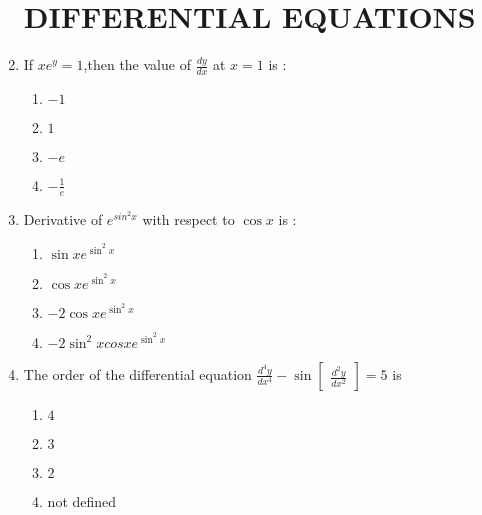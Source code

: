 \documentclass{article}
\providecommand{\myvec}[1]{\ensuremath{\begin{bmatrix}#1\end{bmatrix}}}
\begin{document}
				\begin{enumerate}
						\section{DIFFERENTIAL EQUATIONS}
						    \item If $xe^{y}=1$,then the value of $\frac{dy}{dx}$ at $x = 1$ is :
                \begin{enumerate}
                        \item $-1$
                        \item $1$
                        \item $-e$
                        \item $-\frac{1}{e}$
                \end{enumerate}
                        \item Derivative of $e^{sin^2 x}$ with respect to $\cos x$ is :
                                \begin{enumerate}
                                        \item $\sin x	e^{\sin^2x}$
                                        \item $\cos x	e^{\sin^2x}$
                                        \item $-2\cos	x	e^{\sin^2x}$
                                        \item $-2	\sin^2	x	cos	x	e^{\sin^2x}$
                                \end{enumerate}
			\item The order of the differential equation $\frac{d^4y}{dx^4} - \sin\myvec{\frac{d^2y}{dx^2}}=5$ is
				\begin{enumerate}

                                        \item $4$
                                        \item $3$
                                        \item $2$
                                        \item not defined
				\end{enumerate}
				\end{enumerate}
				
\end{document}
